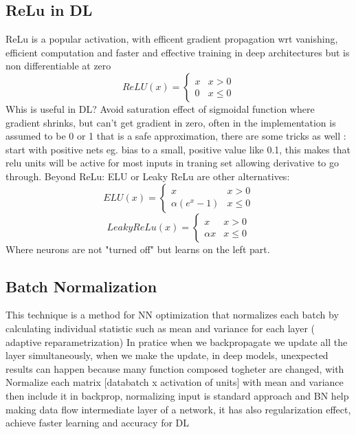 \documentclass[12pt]{book}
\begin{document}
\subsection{ReLu in DL}
ReLu is a popular activation, with efficent gradient propagation wrt vanishing, efficient computation and faster and effective training in deep architectures but is non differentiable at zero
\begin{equation}
	ReLU(x) = \begin{cases}
		x & x > 0 \\
		0 & x \leq 0
	\end{cases}
\end{equation}
Whis is useful in DL? Avoid saturation effect of sigmoidal function where gradient shrinks, but can't get gradient in zero, often in the implementation is assumed to be 0 or 1 that is a safe approximation, there are some tricks as well : start with positive nets eg. bias to a small, positive value like 0.1, this makes that relu units will be active for most inputs in traning set allowing derivative to go through.\newline
Beyond ReLu: ELU or Leaky ReLu are other alternatives:
\begin{equation}
	ELU(x) = \begin{cases}
		x & x > 0 \\
		\alpha(e^x - 1) & x \leq 0
	\end{cases}
\end{equation}
\begin{equation}
	Leaky ReLu(x) = \begin{cases}
		x & x > 0 \\
		\alpha x & x \leq 0
	\end{cases}
\end{equation}
Where neurons are not "turned off" but learns on the left part.
\newline\newline
\subsection{Batch Normalization}
This technique is a method for NN optimization that normalizes each batch by calculating individual statistic such as mean and variance for each layer ( adaptive reparametrization)\newline
In pratice when we backpropagate we update all the layer simultaneously, when we make the update, in deep models, unexpected results can happen because many function composed togheter are changed, with
Normalize each matrix [databatch x activation of units] with mean and variance then include it in backprop, normalizing input is standard approach and BN help making data flow intermediate layer of a network, it has also regularization effect, achieve faster learning and accuracy for DL
\end{document}
